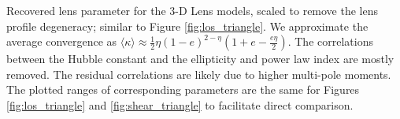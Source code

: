 \label{fig:scaled_triangle} Recovered lens parameter for the 3-D Lens models, scaled to remove the lens profile degeneracy; similar to Figure \ref{fig:los_triangle}. We approximate the average convergence as $\langle \kappa \rangle \approx \frac{1}{2} \eta  (1 - e)^{2 - \eta} \left(1 +  e - \frac{e \eta }{2}\right).$ The correlations between the Hubble constant and the ellipticity and power law index are mostly removed. The residual correlations are likely due to higher multi-pole moments. The plotted ranges of corresponding parameters are the same for Figures \ref{fig:los_triangle} and \ref{fig:shear_triangle} to facilitate direct comparison.